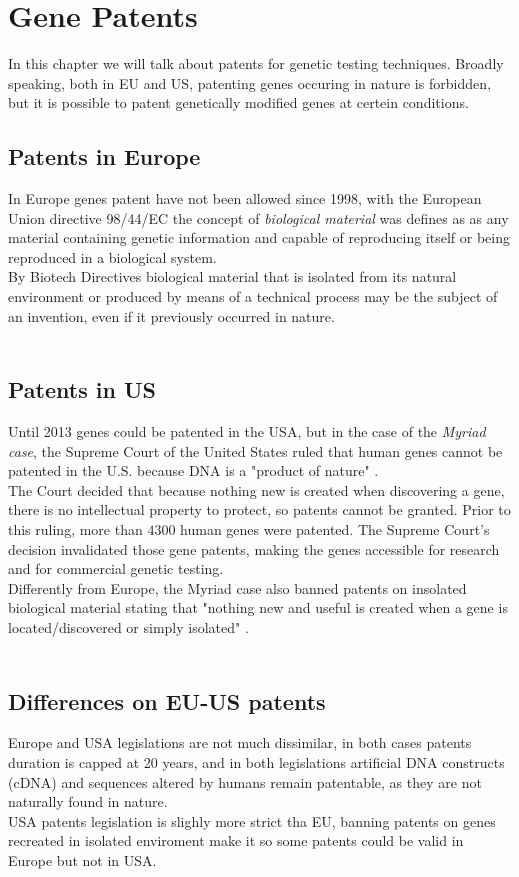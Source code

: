 \documentclass[12pt]{article}
\begin{document}
\section{Gene Patents}
\label{sec:patent}
In this chapter we will talk about patents for genetic testing techniques. Broadly speaking, both in EU and US, patenting genes occuring in nature is forbidden, 
but it is possible to patent genetically modified genes at certein conditions.
\subsection{Patents in Europe}
In Europe genes patent have not been allowed since 1998, with the European Union directive 98/44/EC \cite{directive_98_44} the concept of \emph{biological material} was defines as 
as any material containing genetic information and capable of reproducing itself or being reproduced in a biological system. \cite{patent}\\
By Biotech Directives biological material that is isolated from its natural environment 
or produced by means of a technical process may be the subject of an invention, even if it previously occurred in nature. \cite{patent}\\
\\
\subsection{Patents in US}
Until 2013 genes could be patented in the USA, but in the case of the \emph{Myriad case}, 
the Supreme Court of the United States ruled that human genes cannot be patented in the U.S. because DNA is a "product of nature" \cite{patent}.\\
 The Court decided that because nothing 
new is created when discovering a gene, there is no intellectual property to protect, so patents cannot be granted. Prior to this ruling, 
more than $4300$ human genes were patented. The Supreme Court's decision invalidated those gene patents, making the genes accessible for research and for commercial genetic testing. \cite{genetic_discrimination}\cite{patent}\\
Differently from Europe, the Myriad case also banned patents on insolated biological material stating that "nothing new and useful is created when a gene is located/discovered or simply isolated" \cite{patent}.\\
\\
\subsection{Differences on EU-US patents}
Europe and USA legislations are not much dissimilar, in both cases patents duration is capped at 20 years, and in both legislations artificial DNA constructs (cDNA) and sequences altered by humans remain patentable, as they are not naturally found in nature. \cite{patent}\\
USA patents legislation is slighly more strict tha EU, banning patents on genes recreated in isolated enviroment make it so some patents could be valid in Europe but not in USA.
\\
\newpage
\end{document}
